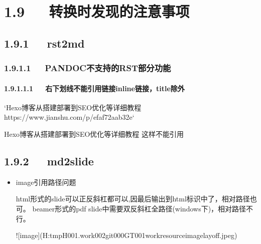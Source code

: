 \documentclass[letterpaper,12pt,english]{sphinxmanual}
\begin{document}
\section{1.9   转换时发现的注意事项}
\label{\detokenize{001software/001install/pandoc:id14}}

\subsection{1.9.1   rst2md}
\label{\detokenize{001software/001install/pandoc:rst2md}}

\subsubsection{1.9.1.1   PANDOC不支持的RST部分功能}
\label{\detokenize{001software/001install/pandoc:pandocrst}}

\paragraph{1.9.1.1.1   右下划线不能引用链接inline链接，title除外}
\label{\detokenize{001software/001install/pandoc:inline-title}}
\begin{sphinxVerbatim}[commandchars=\\\{\}]
`Hexo博客从搭建部署到SEO优化等详细教程 \PYGZlt{}https://www.jianshu.com/p/efaf72aab32e\PYGZgt{}`\PYGZus{}

Hexo博客从搭建部署到SEO优化等详细教程\PYGZus{}
这样不能引用
\end{sphinxVerbatim}


\subsection{1.9.2   md2slide}
\label{\detokenize{001software/001install/pandoc:md2slide}}\begin{itemize}
\item {} 
image引用路径问题

html形式的slide可以正反斜杠都可以,因最后输出到html标识中了，相对路径也可。
beamer形式的pdf slide中需要双反斜杠全路径(windows下)，相对路径不行。

\begin{sphinxVerbatim}[commandchars=\\\{\}]
![image](H:\PYGZbs{}\PYGZbs{}tmp\PYGZus{}H\PYGZbs{}\PYGZbs{}001.work\PYGZbs{}\PYGZbs{}002git\PYGZbs{}\PYGZbs{}000GT\PYGZbs{}\PYGZbs{}001work\PYGZbs{}\PYGZbs{}resource\PYGZbs{}\PYGZbs{}image\PYGZbs{}\PYGZbs{}layoff.jpeg)
\end{sphinxVerbatim}

\end{itemize}
\end{document}
